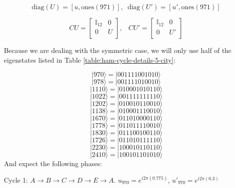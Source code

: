 \documentclass[msc,oneside]{ubcthesis}
\begin{document}
	$$\mathrm{diag}(U) = [u, \mathrm{ones}(971)], \;\; \mathrm{diag}(U') = [u', \mathrm{ones}(971)]$$ 

\begin{equation*}
	CU = \begin{bmatrix}
		\mathbb{I}_{12} & 0 \\
		0 & U \\
	\end{bmatrix},\;\;\;
	CU' = \begin{bmatrix}
		\mathbb{I}_{12} & 0 \\
		0 & U' \\
	\end{bmatrix}
\end{equation*}	
	
	Because we are dealing with the symmetric case, we will only use half of the eigenstates listed in Table \ref{table:ham-cycle-details-5-city}:
	
	$$|970\rangle  = |001111001010\rangle$$
	$$|978\rangle  = |001111010010\rangle$$
	$$|1110\rangle = |010001010110\rangle$$
	$$|1022\rangle = |001111111110\rangle$$
	$$|1202\rangle = |010010110010\rangle$$
	$$|1138\rangle = |010001110010\rangle$$
	$$|1670\rangle = |011010000110\rangle$$
	$$|1778\rangle = |011011110010\rangle$$
	$$|1830\rangle = |011100100110\rangle$$
	$$|1726\rangle = |011010111110\rangle$$
	$$|2230\rangle = |100010110110\rangle$$
	$$|2410\rangle = |100101101010\rangle$$
	And expect the following phases:
	
		Cycle 1: $A \rightarrow B \rightarrow C \rightarrow D \rightarrow E \rightarrow A$.\;\;\;\;\;\;\;\;\;\;\;\;\;\; $u_{970}  = e^{i2\pi(0.775)}$, \;\;\;\;\;$u'_{970} = e^{i2\pi(0.3)}$
		
\end{document}
